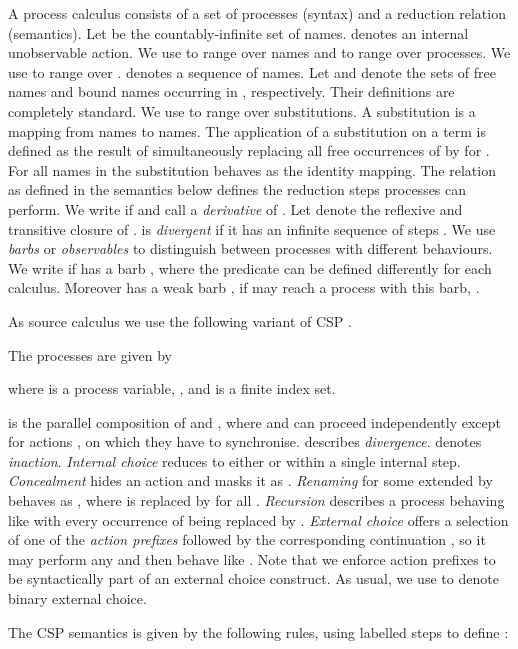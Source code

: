 \documentclass[copyright,creativecommons]{eptcs}
\begin{document}
A process calculus  consists of a set  of processes (syntax) and a reduction relation  (semantics).
Let  be the countably-infinite set of names.
 denotes an internal unobservable action.
We use  to range over names and  to range over processes.
We use  to range over .
 denotes a sequence of names.
Let  and   denote the sets of free names and bound names occurring in , respectively.
Their definitions are completely standard.
We use  to range over substitutions.
A substitution is a mapping  from names to names.
The application of a substitution on a term  is defined as the result of simultaneously replacing all free occurrences of  by  for .
For all names in  the substitution behaves as the identity mapping.
The relation  as defined in the semantics below defines the reduction steps processes can perform. We write  if  and call  a \emph{derivative} of .
Let  denote the reflexive and transitive closure of .
 is \emph{divergent} if it has an infinite sequence of steps .
We use \emph{barbs} or \emph{observables} to distinguish between processes with different behaviours. We write  if  has a barb , where the predicate  can be defined differently for each calculus. Moreover  has a weak barb , if  may reach a process with this barb, \ie .

As source calculus we use the following variant of CSP \cite{hoare:78csp}.

\begin{definition}\label{CSPSyntax}
The processes  are given by

	where  is a process variable, , and  is a finite index set.
\end{definition}

 is the parallel composition of  and , where  and  can proceed independently except for actions , on which they have to synchronise.
 describes \emph{divergence}.
 denotes \emph{inaction}.
\emph{Internal choice}  reduces to either  or  within a single internal step.
\emph{Concealment}  hides an action  and masks it as .
\emph{Renaming}  for some  extended by  behaves as , where  is replaced by  for all .
\emph{Recursion}  describes a process behaving like  with every occurrence of  being replaced by .
\emph{External choice}  offers a selection of one of the \emph{action prefixes}  followed by the corresponding continuation , so it may perform any  and then behave like . Note that we enforce action prefixes to be syntactically part of an external choice construct.
 As usual, we use  to denote binary external choice.

The CSP semantics is given by the following rules, using labelled steps  to define :
\vspace{-0.75em}
\end{document}
